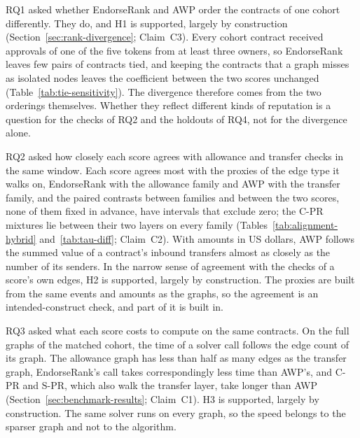 RQ1 asked whether EndorseRank and AWP order the contracts of one cohort differently. They do, and H1 is supported, largely by construction (Section~\ref{sec:rank-divergence}; Claim~C3). Every cohort contract received approvals of one of the five tokens from at least three owners, so EndorseRank leaves few pairs of contracts tied, and keeping the contracts that a graph misses as isolated nodes leaves the coefficient between the two scores unchanged (Table~\ref{tab:tie-sensitivity}). The divergence therefore comes from the two orderings themselves. Whether they reflect different kinds of reputation is a question for the checks of RQ2 and the holdouts of RQ4, not for the divergence alone.

RQ2 asked how closely each score agrees with allowance and transfer checks in the same window. Each score agrees most with the proxies of the edge type it walks on, EndorseRank with the allowance family and AWP with the transfer family, and the paired contrasts between families and between the two scores, none of them fixed in advance, have intervals that exclude zero; the C-PR mixtures lie between their two layers on every family (Tables~\ref{tab:alignment-hybrid} and~\ref{tab:tau-diff}; Claim~C2). With amounts in US dollars, AWP follows the summed value of a contract's inbound transfers almost as closely as the number of its senders. In the narrow sense of agreement with the checks of a score's own edges, H2 is supported, largely by construction. The proxies are built from the same events and amounts as the graphs, so the agreement is an intended-construct check, and part of it is built in.

RQ3 asked what each score costs to compute on the same contracts. On the full graphs of the matched cohort, the time of a solver call follows the edge count of its graph. The allowance graph has less than half as many edges as the transfer graph, EndorseRank's call takes correspondingly less time than AWP's, and C-PR and S-PR, which also walk the transfer layer, take longer than AWP (Section~\ref{sec:benchmark-results}; Claim~C1). H3 is supported, largely by construction. The same solver runs on every graph, so the speed belongs to the sparser graph and not to the algorithm.

